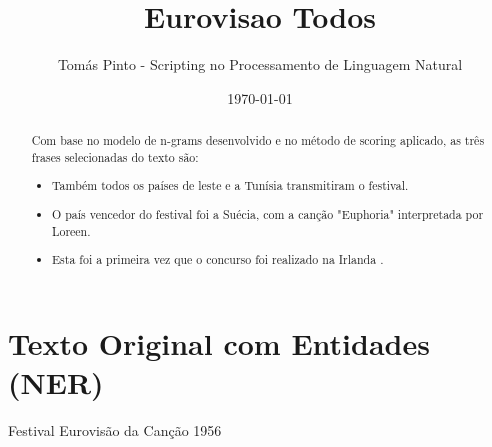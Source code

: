 \documentclass[12pt,a4paper]{article}
\title{Eurovisao Todos}
\author{Tomás Pinto - Scripting no Processamento de Linguagem Natural}
\date{\today}
\begin{document}
\maketitle

\begin{abstract}
Com base no modelo de n-grams desenvolvido e no método de scoring aplicado, as três frases selecionadas do texto são:
\begin{itemize}
    \item Também todos os países de leste e a Tunísia transmitiram o festival.
    \item O país vencedor do festival foi a Suécia, com a canção "Euphoria" interpretada por Loreen.
    \item Esta foi a primeira vez que o concurso foi realizado na Irlanda .
\end{itemize}
\end{abstract}

\section{Texto Original com Entidades (NER)}
Festival Eurovisão da Canção 1956
\end{document}
